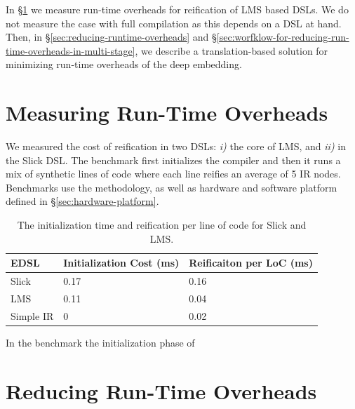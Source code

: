 
In \S \ref{sec:measuring-overheads-in-the-deep-embedding} we measure run-time overheads for reification of
 LMS based DSLs. We do not measure the case with full compilation as this depends on a DSL at hand.
 Then, in \S \ref{sec:reducing-runtime-overheads} and \S \ref{sec:worfklow-for-reducing-run-time-overheads-in-multi-stage}, we describe a
 translation-based solution for minimizing run-time overheads of the deep embedding.

\section{Measuring Run-Time Overheads}
\label{sec:measuring-overheads-in-the-deep-embedding}

We measured the cost of reification in two DSLs: \emph{i)} the core of LMS, and \emph{ii)} in the Slick DSL.
The benchmark first initializes the compiler and then it runs a mix of synthetic lines of code where
each line reifies an average of 5 IR nodes. Benchmarks use the methodology, as well as hardware
and software platform defined in \S \ref{sec:hardware-platform}.

\begin{table}[ht]
\caption{The initialization time and reification per line of code for Slick and LMS.}
\label{tbl:reification-cost}
\centering
\begin{tabularx}{\linewidth}{ X Y Y }
\toprule
EDSL       &   Initialization Cost (ms)    &     Reificaiton per LoC (ms)\\ \midrule
Slick      &           0.17                &     0.16                   \\
LMS        &           0.11                &     0.04                   \\
Simple IR  &           0                   &     0.02                  \\
\bottomrule
\end{tabularx}
\end{table}


In the benchmark the initialization phase of

\section{Reducing Run-Time Overheads}
\label{sec:reducing-run-time-overheads}

